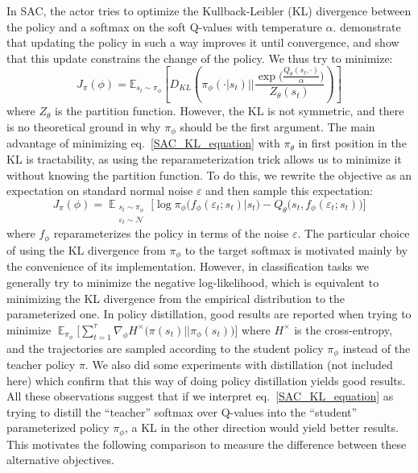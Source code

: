 \documentclass[letterpaper]{article} \usepackage{aaai20}  \usepackage{times}  \usepackage{helvet} \usepackage{courier}  \usepackage[hyphens]{url}  \usepackage{graphicx} \urlstyle{rm} \def\UrlFont{\rm}  \usepackage{graphicx}  \usepackage[section]{placeins}
\begin{document}
In SAC, the actor tries to optimize the Kullback-Leibler (KL) divergence between the policy and a softmax on the soft Q-values with temperature $\alpha$. \cite{haarnoja2018soft} demonstrate that updating the policy in such a way improves it until convergence, and \cite{abdolmaleki2018relative} show that this update constrains the change of the policy. We thus try to minimize: 
\begin{equation} 
\label{SAC_KL_equation}
    J_{\pi}(\phi) = \mathbb{E}_{s_t \sim \pi_{\phi}} \left[ D_{KL} \left(\pi_{\phi}(\cdot | s_t) \bigg|\bigg| \frac{\exp\big(\frac{ Q_{\theta}(s_t, \cdot)}{\alpha}\big)}{Z_{\theta} (s_t)} \right) \right]
\end{equation}
where $Z_{\theta}$ is the partition function. However, the KL is not symmetric, and there is no theoretical ground in why $\pi_{\phi}$ should be the first argument. The main advantage of minimizing eq.~\ref{SAC_KL_equation} with $\pi_{\theta}$ in first position in the KL is tractability, as using the reparameterization trick allows us to minimize it without knowing the partition function. To do this, we rewrite the objective as an expectation on standard normal noise $\varepsilon$ and then sample this expectation: 
\begin{equation} 
\label{sampled_SAC_KL_equation}
    J_{\pi}(\phi) = \mathop{\mathbb{E}}_{\substack{s_t \sim \pi_{\phi} \\ \varepsilon_t \sim \mathcal{N}}} \Big[\log \pi_{\phi}\big(f_{\phi}(\varepsilon_t; s_t) | s_t \big) - Q_{\theta} \big( s_t, f_{\phi}(\varepsilon_t; s_t) \big) \Big]
\end{equation}
where $f_{\phi}$ reparameterizes the policy in terms of the noise $\varepsilon$. The particular choice of using the KL divergence from $\pi_{\phi}$ to the target softmax is motivated mainly by the convenience of its implementation. However, in classification tasks we generally try to minimize the negative log-likelihood, which is equivalent to minimizing the KL divergence from the empirical distribution to the parameterized one. In policy distillation, \cite{czarnecki2019distilling,parisotto2015actor,schmitt2018kickstarting} good results are reported when trying to minimize $\mathop{\mathbb{E}}_{\pi_{\phi}} \bigg [ \sum_{t=1}^{\tau} \nabla_{\phi}H^{\times}\big(\pi(s_t) || \pi_{\phi}(s_t) \big) \bigg ]$ where $H^{\times}$ is the cross-entropy, and the trajectories are sampled according to the student policy $\pi_{\phi}$ instead of the teacher policy $\pi$. We also did some experiments with distillation (not included here) which confirm that this way of doing policy distillation yields good results. All these observations suggest that if we interpret eq.~\ref{SAC_KL_equation} as trying to distill the ``teacher'' softmax over Q-values into the ``student'' parameterized policy $\pi_{\phi}$, a KL in the other direction would yield better results. This motivates the following comparison to measure the difference between these alternative objectives.
\end{document}
